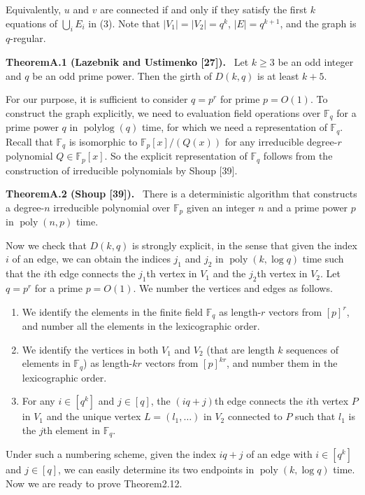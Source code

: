 \documentclass[10pt,a4paper]{article}
\newenvironment{authorclaim}[1]{\par\medskip\noindent\textbf{#1.}\ }{\par\medskip}
\begin{document}
Equivalently, $u$ and $v$ are connected if and only if they satisfy the first $k$ equations of $\bigcup_i E_i$ in (3). Note that $|V_1|=|V_2|=q^k$, $|E|=q^{k+1}$, and the graph is $q$-regular.
\begin{authorclaim}{TheoremA.1 (Lazebnik and Ustimenko [27])}
Let $k\ge3$ be an odd integer and $q$ be an odd prime power. Then the girth of $D(k,q)$ is at least $k+5$.
\end{authorclaim}
For our purpose, it is sufficient to consider $q=p^r$ for prime $p=O(1)$. To construct the graph explicitly, we need to evaluation field operations over $\mathbb F_q$ for a prime power $q$ in $\operatorname{polylog}(q)$ time, for which we need a representation of $\mathbb F_q$. Recall that $\mathbb F_q$ is isomorphic to $\mathbb F_p[x]/(Q(x))$ for any irreducible degree-$r$ polynomial $Q\in\mathbb F_p[x]$. So the explicit representation of $\mathbb F_q$ follows from the construction of irreducible polynomials by Shoup [39].
\begin{authorclaim}{TheoremA.2 (Shoup [39])}
There is a deterministic algorithm that constructs a degree-$n$ irreducible polynomial over $\mathbb F_p$ given an integer $n$ and a prime power $p$ in $\operatorname{poly}(n,p)$ time.
\end{authorclaim}
Now we check that $D(k,q)$ is strongly explicit, in the sense that given the index $i$ of an edge, we can obtain the indices $j_1$ and $j_2$ in $\operatorname{poly}(k,\log q)$ time such that the $i$th edge connects the $j_1$th vertex in $V_1$ and the $j_2$th vertex in $V_2$. Let $q=p^r$ for a prime $p=O(1)$. We number the vertices and edges as follows.
\begin{enumerate}
\item We identify the elements in the finite field $\mathbb F_q$ as length-$r$ vectors from $[p]^r$, and number all the elements in the lexicographic order.
\item We identify the vertices in both $V_1$ and $V_2$ (that are length $k$ sequences of elements in $\mathbb F_q$) as length-$kr$ vectors from $[p]^{kr}$, and number them in the lexicographic order.
\item For any $i\in[q^k]$ and $j\in[q]$, the $(iq+j)$th edge connects the $i$th vertex $P$ in $V_1$ and the unique vertex $L=(l_1,\ldots)$ in $V_2$ connected to $P$ such that $l_1$ is the $j$th element in $\mathbb F_q$.
\end{enumerate}
Under such a numbering scheme, given the index $iq+j$ of an edge with $i\in[q^k]$ and $j\in[q]$, we can easily determine its two endpoints in $\operatorname{poly}(k,\log q)$ time. Now we are ready to prove Theorem2.12.
\end{document}
